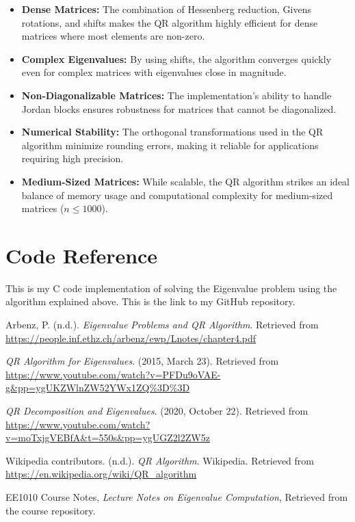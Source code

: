 \documentclass[12pt]{article}
\begin{document}
\begin{itemize}
    \item \textbf{Dense Matrices:} The combination of Hessenberg reduction, Givens rotations, and shifts makes the QR algorithm highly efficient for dense matrices where most elements are non-zero.  
    \item \textbf{Complex Eigenvalues:} By using shifts, the algorithm converges quickly even for complex matrices with eigenvalues close in magnitude.  
    \item \textbf{Non-Diagonalizable Matrices:} The implementation's ability to handle Jordan blocks ensures robustness for matrices that cannot be diagonalized.  
    \item \textbf{Numerical Stability:} The orthogonal transformations used in the QR algorithm minimize rounding errors, making it reliable for applications requiring high precision.  
    \item \textbf{Medium-Sized Matrices:} While scalable, the QR algorithm strikes an ideal balance of memory usage and computational complexity for medium-sized matrices (\(n \leq 1000\)).  
\end{itemize}

\section{Code Reference}
This is my C code implementation of solving the Eigenvalue problem using the algorithm explained above. This is the link to my GitHub repository. 
\url{}

\begin{thebibliography}{99}

 Arbenz, P. (n.d.). \textit{Eigenvalue Problems and QR Algorithm}. Retrieved from \url{https://people.inf.ethz.ch/arbenz/ewp/Lnotes/chapter4.pdf}

 \textit{QR Algorithm for Eigenvalues}. (2015, March 23). Retrieved from \url{https://www.youtube.com/watch?v=PFDu9oVAE-g&pp=ygUKZWlnZW52YWx1ZQ%3D%3D}

 \textit{QR Decomposition and Eigenvalues}. (2020, October 22). Retrieved from \url{https://www.youtube.com/watch?v=moTxjgVEBfA&t=550s&pp=ygUGZ2l2ZW5z}

 Wikipedia contributors. (n.d.). \textit{QR Algorithm}. Wikipedia. Retrieved from \url{https://en.wikipedia.org/wiki/QR_algorithm}

 EE1010 Course Notes, \textit{Lecture Notes on Eigenvalue Computation}, Retrieved from the course repository.

\end{thebibliography}
\end{document}
